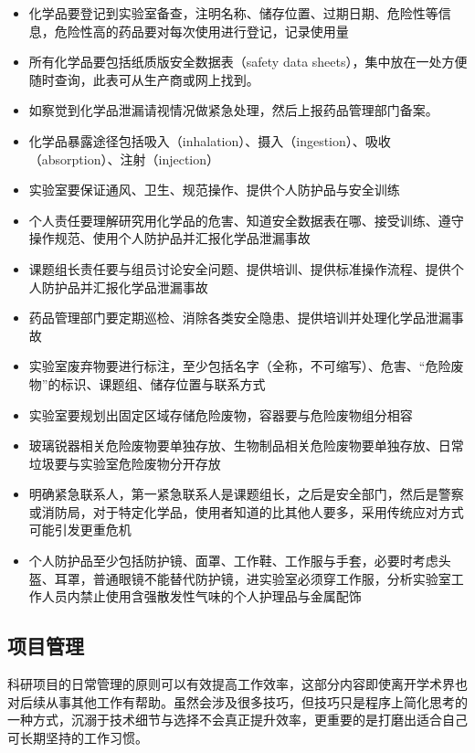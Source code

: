 \documentclass[]{tufte-book}
\providecommand{\tightlist}{%
  \setlength{\itemsep}{0pt}\setlength{\parskip}{0pt}}
\begin{document}
\begin{itemize}
\tightlist
\item
  化学品要登记到实验室备查，注明名称、储存位置、过期日期、危险性等信息，危险性高的药品要对每次使用进行登记，记录使用量
\item
  所有化学品要包括纸质版安全数据表（safety data sheets），集中放在一处方便随时查询，此表可从生产商或网上找到。
\item
  如察觉到化学品泄漏请视情况做紧急处理，然后上报药品管理部门备案。
\item
  化学品暴露途径包括吸入（inhalation）、摄入（ingestion）、吸收（absorption）、注射（injection）
\item
  实验室要保证通风、卫生、规范操作、提供个人防护品与安全训练
\item
  个人责任要理解研究用化学品的危害、知道安全数据表在哪、接受训练、遵守操作规范、使用个人防护品并汇报化学品泄漏事故
\item
  课题组长责任要与组员讨论安全问题、提供培训、提供标准操作流程、提供个人防护品并汇报化学品泄漏事故
\item
  药品管理部门要定期巡检、消除各类安全隐患、提供培训并处理化学品泄漏事故
\item
  实验室废弃物要进行标注，至少包括名字（全称，不可缩写）、危害、``危险废物''的标识、课题组、储存位置与联系方式
\item
  实验室要规划出固定区域存储危险废物，容器要与危险废物组分相容
\item
  玻璃锐器相关危险废物要单独存放、生物制品相关危险废物要单独存放、日常垃圾要与实验室危险废物分开存放
\item
  明确紧急联系人，第一紧急联系人是课题组长，之后是安全部门，然后是警察或消防局，对于特定化学品，使用者知道的比其他人要多，采用传统应对方式可能引发更重危机
\item
  个人防护品至少包括防护镜、面罩、工作鞋、工作服与手套，必要时考虑头盔、耳罩，普通眼镜不能替代防护镜，进实验室必须穿工作服，分析实验室工作人员内禁止使用含强散发性气味的个人护理品与金属配饰
\end{itemize}

\hypertarget{ux9879ux76eeux7ba1ux7406}{%
\subsection{项目管理}\label{ux9879ux76eeux7ba1ux7406}}

科研项目的日常管理的原则可以有效提高工作效率，这部分内容即使离开学术界也对后续从事其他工作有帮助。虽然会涉及很多技巧，但技巧只是程序上简化思考的一种方式，沉溺于技术细节与选择不会真正提升效率，更重要的是打磨出适合自己可长期坚持的工作习惯。
\end{document}
